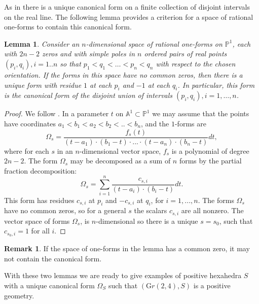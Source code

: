 \documentclass[12pt]{extarticle}
\newtheorem{lemma}[theorem]{Lemma}
\theoremstyle{definition}
\newtheorem{remark}[theorem]{Remark}
\begin{document}
 As in \cite[Lemma 2.16]{kohn2021adjoints} there is a unique canonical form on a finite collection of disjoint intervals on the real line. The following lemma provides a criterion for a space of rational one-forms to contain this canonical form.
 \begin{lemma}\label{residuesonsegments}
     Consider an $n$-dimensional space of rational one-forms on $\mathbb{P}^1$, each with $2n-2$ zeros and with simple poles in $n$ ordered pairs of real points $(p_i,q_i), i=1..n$ so that $p_1<q_1<\ldots<p_n<q_n$ with respect to the chosen orientation. If the forms in this space have no common zeros, then there is a unique form with residue $1$ at each $p_i$ and $-1$ at each $q_i$. In particular, this form is the canonical form of the disjoint union of intervals $(p_i,q_i), i=1,\ldots,n$.
 \end{lemma}
 \begin{proof} We follow \cite[Lemma 2.16]{kohn2021adjoints}. In a parameter $t$ on $\mathbb{A}^1\subset \mathbb{P}^1$ we may assume that the points have coordinates $a_1<b_1<a_2<b_2<..<b_n$, and the $1$-forms are $$\Omega_s=\frac{f_s(t)}{(t-a_1)\cdot(b_1-t)\cdot ...\cdot (t-a_n)\cdot (b_n-t)}dt,$$ where for each $s$ in an $n$-dimensional vector space, $f_s$ is a polynomial of degree $2n-2$. The form $\Omega_s$ may be decomposed as a sum of $n$ forms by the partial fraction decomposition:
 $$\Omega_s=\sum_{i=1}^n\frac{c_{s,i}}{(t-a_i)\cdot(b_i-t)}dt.$$ This form has residues $c_{s,i}$ at $p_i$ and $-c_{s,i}$ at $q_i$, for $i=1,...,n$. 
 The forms $\Omega_s$ have no common zeros, so for a general $s$ the scalars $c_{s,i}$ are all nonzero.  
 The vector space of forms $\Omega_s$, is $n$-dimensional so there is a unique $s=s_0$, such that 
 $c_{s_0,i}=1$ for all $i$. 
 \end{proof}
\begin{remark} If the space of one-forms in the lemma has a common zero, it may not contain the canonical form.
\end{remark}
 
With these two lemmas we are ready to give examples of positive hexahedra $S$ with a unique canonical form $\Omega_S$ such that $(\mathrm Gr(2,4),S)$ is a positive geometry. 
\end{document}
